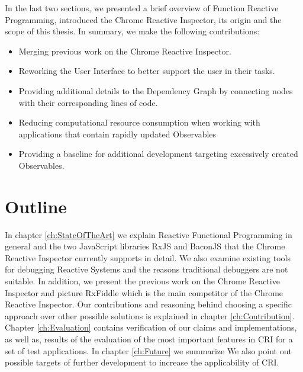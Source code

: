 In the last two sections, we presented a brief overview of Function Reactive Programming, introduced the Chrome Reactive Inspector, its origin and the scope of this thesis.
In summary, we make the following contributions:

\begin{itemize}
	\item Merging previous work on the Chrome Reactive Inspector.
	\item Reworking the User Interface to better support the user in their tasks.
	\item Providing additional details to the Dependency Graph by connecting nodes with their corresponding lines of code.
	\item Reducing computational resource consumption when working with applications that contain rapidly updated Observables
	\item Providing a baseline for additional development targeting excessively created Observables.
\end{itemize}

\section{Outline}
In chapter \ref{ch:StateOfTheArt} we explain Reactive Functional Programming in general and the two JavaScript libraries RxJS and BaconJS that the Chrome Reactive Inspector currently supports in detail. We also examine existing tools for debugging Reactive Systems and the reasons traditional debuggers are not suitable. In addition, we present the previous work on the Chrome Reactive Inspector and picture RxFiddle which is the main competitor of the Chrome Reactive Inspector.
Our contributions and reasoning behind choosing a specific approach over other possible solutions is explained in chapter \ref{ch:Contribution}.
Chapter \ref{ch:Evaluation} contains verification of our claims and implementations, as well as, results of the evaluation of the most important features in CRI for a set of test applications.
In chapter \ref{ch:Future} we summarize  We also point out possible targets of further development to increase the applicability of CRI.
